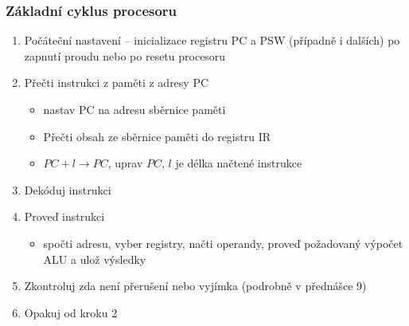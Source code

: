 \documentclass{beamer}
\begin{document}
\begin{frame}
\frametitle{Základní cyklus procesoru}
\begin{enumerate}
  \item Počáteční nastavení -- inicializace registru PC a PSW (případně i dalších) po zapnutí proudu nebo po resetu procesoru
  \item Přečti instrukci z paměti z adresy PC
  \begin{itemize}
    \item nastav PC na adresu sběrnice paměti
    \item Přečti obsah ze sběrnice paměti do registru IR
    \item $PC+l \to PC$, uprav $PC$, $l$ je délka načtené instrukce
  \end{itemize}
  \item Dekóduj instrukci
  \item Proveď instrukci
  \begin{itemize}
    \item spočti adresu, vyber registry, načti operandy, proveď požadovaný výpočet ALU a ulož výsledky
  \end{itemize}
  \item Zkontroluj zda není přerušení nebo vyjímka (podrobně v přednášce 9)
  \item Opakuj od kroku 2
\end{enumerate}
\end{frame}
\end{document}
